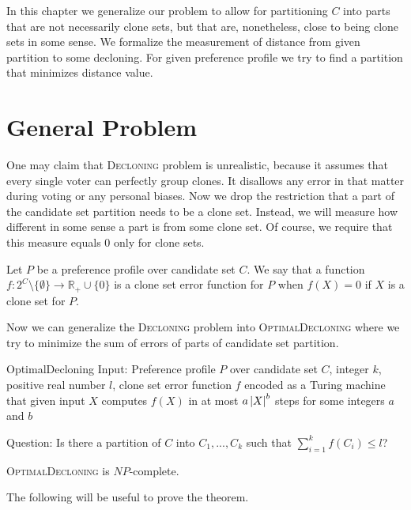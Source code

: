 In this chapter we generalize our problem to allow for partitioning $C$ into parts
that are not necessarily clone sets, but that are, nonetheless, close to being clone sets in some sense.
We formalize the measurement of distance from given partition to some decloning.
For given preference profile we try to find a partition that minimizes distance value.

\section{General Problem}

One may claim that \textsc{Decloning} problem is unrealistic,
because it assumes that every single voter can perfectly group clones.
It disallows any error in that matter during voting or any personal biases.
Now we drop the restriction that a part of the candidate set partition needs to be a clone set.
Instead, we will measure how different in some sense a part is from some clone set.
Of course, we require that this measure equals $0$ only for clone sets.

\begin{defn}
Let $P$ be a preference profile over candidate set $C$.
We say that a function
$f: 2^C \setminus \{\emptyset\} \rightarrow \mathbb{R}_+\cup\{0\}$
is a clone set error function for $P$ when $f(X) = 0$ if $X$ is a clone set for $P$.
\end{defn}

Now we can generalize the \textsc{Decloning} problem into \textsc{OptimalDecloning}
where we try to minimize the sum of errors of parts of candidate set partition.

\begin{problem}{OptimalDecloning}
	Input: Preference profile $P$ over candidate set $C$, integer $k$, positive real number $l$,
        clone set error function $f$ encoded as a Turing machine that given input $X$ computes $f(X)$
        in at most $a \left\vert X \right\vert^b$ steps for some integers $a$ and $b$

	Question: Is there a partition of $C$ into $C_1, ..., C_k$ such that $\sum_{i=1}^k f(C_i) \leq l$?
\end{problem}

\begin{thm} \label{optdecl}
	\textsc{OptimalDecloning} is $NP$-complete.
\end{thm}

The following will be useful to prove the theorem.

